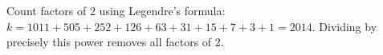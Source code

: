 Count factors of 2 using Legendre's formula: $k=1011+505+252+126+63+31+15+7+3+1=\boxed{2014}$. Dividing by precisely this power removes all factors of 2.
